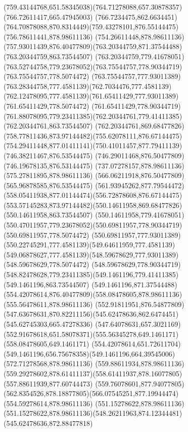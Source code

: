 {{	\curveto(759.43144768,651.58345038)(764.71278088,657.30878357)(766.72611417,665.47945003)
	\lineto(766.7234475,862.6634451)
	\curveto(764.70878088,870.8314449)(759.43278101,876.55144475)(756.78611441,878.98611136)
	\lineto(754.26611448,878.98611136)
	\curveto(757.93011439,876.40477809)(763.20344759,871.37544488)(763.20344759,863.73544507)
	\lineto(763.20344759,779.41678051)
	\curveto(763.52744758,779.23678052)(763.75544757,778.90344719)(763.75544757,778.5074472)
	\curveto(763.75544757,777.93011389)(763.28344758,777.4581139)(762.7034476,777.4581139)
	\curveto(762.12478095,777.4581139)(761.65411429,777.93011389)(761.65411429,778.5074472)
	\curveto(761.65411429,778.90344719)(761.88078095,779.23411385)(762.20344761,779.41411385)
	\lineto(762.20344761,863.73544507)
	\curveto(762.20344761,869.68477826)(758.77811436,873.97144482)(755.62078111,876.67144475)
	\curveto(754.29411448,877.01411141)(750.41011457,877.79411139)(746.38211467,876.53544475)
	\lineto(746.29011468,876.50477809)
	\lineto(746.19678135,876.53144475)
	\lineto(737.07278157,878.98611136)
	\lineto(575.27811895,878.98611136)
	\lineto(566.06211918,876.50477809)
	\lineto(565.96878585,876.53544475)
	\curveto(561.93945262,877.79544472)(558.05411938,877.01144474)(556.72878608,876.67144475)
	\curveto(553.57145283,873.97144482)(550.14611958,869.68477826)(550.14611958,863.73544507)
	\lineto(550.14611958,779.41678051)
	\curveto(550.47011957,779.23678052)(550.69811957,778.90344719)(550.69811957,778.5074472)
	\curveto(550.69811957,777.93011389)(550.22745291,777.4581139)(549.64611959,777.4581139)
	\curveto(549.06878627,777.4581139)(548.59678629,777.93011389)(548.59678629,778.5074472)
	\curveto(548.59678629,778.90344719)(548.82478628,779.23411385)(549.1461196,779.41411385)
	\lineto(549.1461196,863.73544507)
	\curveto(549.1461196,871.37544488)(554.42078614,876.40477809)(558.08478605,878.98611136)
	\lineto(555.56478611,878.98611136)
	\curveto(552.91811951,876.54877809)(547.63678631,870.82211156)(545.62478636,862.6474451)
	\lineto(545.62745303,665.47278336)
	\curveto(547.64078631,657.3021169)(552.91678618,651.58078371)(555.56345278,649.1461171)
	\lineto(558.08478605,649.1461171)
	\curveto(554.42078614,651.72611704)(549.1461196,656.75678358)(549.1461196,664.39545006)
	\moveto(572.71278568,878.98611136)
	\lineto(559.88611934,878.98611136)
	\curveto(559.29278602,878.61411137)(558.61411937,878.16077805)(557.88611939,877.60744473)
	\curveto(559.76078601,877.94077805)(562.8354526,878.18877805)(566.07545251,877.19944474)
	\closepath
	\moveto(554.59278614,878.98611136)
	\lineto(551.15278622,878.98611136)
	\curveto(551.15278622,878.98611136)(548.26211963,874.12344481)(545.62478636,872.88477818)
}}
